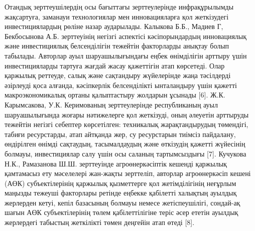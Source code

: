 \begin{multicols}{2}
Отандық зерттеушілердің осы бағыттағы зерттеулерінде инфрақұрылымды
жақсартуға, заманауи технологиялар мен инновацияларға қол жеткізудегі
инвестициялардың рөліне назар аударылады. Калыкова Б.Б., Мадиев Г,
Бекбосынова А.Б. зерттеуінің негізгі аспектісі кәсіпорындардың
инновациялық және инвестициялық белсенділігін тежейтін факторларды
анықтау болып табылады. Авторлар ауыл шаруашылығындағы еңбек өнімділігін
арттыру үшін инвестицияларды тартуға жағдай жасау қажеттігін атап
көрсетеді. Олар қаржылық реттеуде, салық және сақтандыру жүйелерінде
жаңа тәсілдерді әзірлеуді қоса алғанда, кәсіпкерлік белсенділікті
ынталандыру үшін қажетті макроэкономикалық ортаны қалыптастыру жолдарын
ұсынады {[}6{]}. Ж.К. Карымсакова, У.К. Керимованың зерттеулерінде
республиканың ауыл шаруашылығында жоғары нәтижелерге қол жеткізуді, оның
әлеуетін арттыруды тежейтін негізгі себептер көрсетілген: техникалық
жарақтандырудың төмендігі, табиғи ресурстарды, атап айтқанда жер, су
ресурстарын тиімсіз пайдалану, өндірілген өнімді сақтаудың,
тасымалдаудың және өткізудің қажетті жүйесінің болмауы, инвестициялар
салу үшін осы саланың тартымсыздығы {[}7{]}. Кучукова Н.К., Рамазанова
Ш.Ш. зерттеуінде агроөнеркәсіптік кешенді қаржылық қамтамасыз ету
мәселелері жан-жақты зерттеліп, авторлар агроөнеркәсіп кешені (АӨК)
субъектілерінің қаржылық қызметтерге қол жетімділігінің неғұрлым маңызды
тежеуші факторлары ретінде еңбекке қабілетті халықтың ауылдық жерлерден
кетуі, кепіл базасының болмауы немесе жетіспеушілігі, сондай-ақ шағын
АӨК субъектілерінің төлем қабілеттілігіне теріс әсер ететін ауылдық
жерлердегі табыстың жеткілікті төмен деңгейін атап өтеді {[}8{]}.


\end{multicols}
